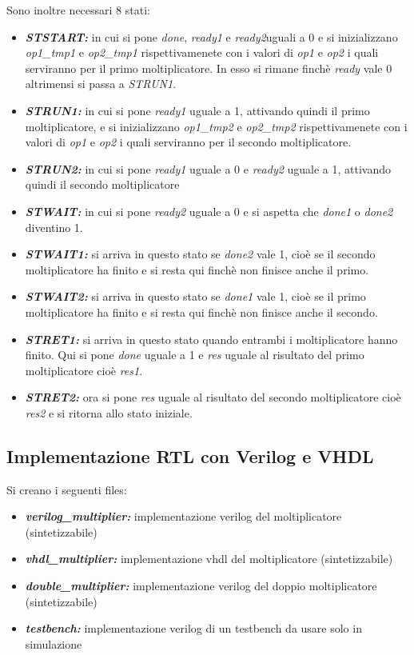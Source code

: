 \documentclass[]{IEEEtran}
\begin{document}
Sono inoltre necessari 8 stati:

\begin{itemize}
\item {\it\bf ST\textunderscore START:} in cui si pone {\it done}, {\it ready1} e {\it ready2}uguali a 0 e si inizializzano {\it op1_tmp1} e {\it op2_tmp1} rispettivamenete con i valori di {\it op1} e {\it op2} i quali serviranno per il primo moltiplicatore. In esso si rimane finchè {\it ready} vale 0 altrimensi si passa a {\it ST\textunderscore RUN1}.
\item {\it\bf ST\textunderscore RUN1:} in cui si pone {\it ready1} uguale a 1, attivando quindi il primo moltiplicatore, e si inizializzano {\it op1_tmp2} e {\it op2_tmp2} rispettivamenete con i valori di {\it op1} e {\it op2} i quali serviranno per il secondo moltiplicatore.
\item {\it\bf ST\textunderscore RUN2:} in cui si pone {\it ready1} uguale a 0 e {\it ready2} uguale a 1, attivando quindi il secondo moltiplicatore
\item {\it\bf ST\textunderscore WAIT:} in cui si pone {\it ready2} uguale a 0 e si aspetta che {\it done1} o {\it done2} diventino 1.
\item {\it\bf ST\textunderscore WAIT1:} si arriva in questo stato se {\it done2} vale 1, cioè se il secondo moltiplicatore ha finito e si resta qui finchè non finisce anche il primo.
\item {\it\bf ST\textunderscore WAIT2:} si arriva in questo stato se {\it done1} vale 1, cioè se il primo moltiplicatore ha finito e si resta qui finchè non finisce anche il secondo.
\item {\it\bf ST\textunderscore RET1:} si arriva in questo stato quando entrambi i moltiplicatore hanno finito. Qui si pone {\it done} uguale a 1 e {\it res} uguale al risultato del primo moltiplicatore cioè {\it res1}.
\item {\it\bf ST\textunderscore RET2:} ora si pone {\it res} uguale al risultato del secondo moltiplicatore cioè {\it res2} e si ritorna allo stato iniziale.
\end{itemize}


\subsection{Implementazione RTL con Verilog e VHDL}
Si creano i seguenti files:
\begin{itemize}
\item {\it\bf verilog_multiplier:} implementazione verilog del moltiplicatore (sintetizzabile)
\item {\it\bf vhdl_multiplier:} implementazione vhdl del moltiplicatore (sintetizzabile)
\item {\it\bf double_multiplier:} implementazione verilog del doppio moltiplicatore (sintetizzabile)
\item {\it\bf testbench:} implementazione verilog di un testbench da usare solo in simulazione
\end{itemize}
\end{document}

